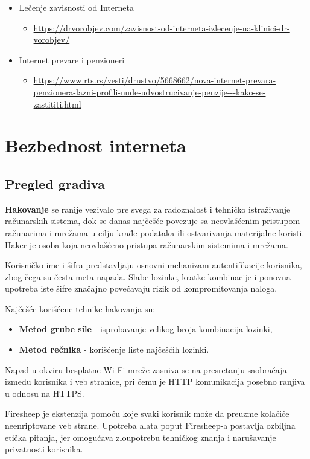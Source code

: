 \documentclass[a4paper, 12pt]{article}
\begin{document}
\begin{itemize}
    \item Lečenje zavisnosti od Interneta
    \begin{itemize}
        \item \url{https://drvorobjev.com/zavisnost-od-interneta-izlecenje-na-klinici-dr-vorobjev/}
    \end{itemize}
    \item Internet prevare i penzioneri
    \begin{itemize}
        \item \url{https://www.rts.rs/vesti/drustvo/5668662/nova-internet-prevara-penzionera-lazni-profili-nude-udvostrucivanje-penzije---kako-se-zastititi.html}
    \end{itemize}
    
\end{itemize}


\section{Bezbednost interneta}
\subsection{Pregled gradiva}
\textbf{Hakovanje} se ranije vezivalo pre svega za radoznalost i tehničko istraživanje
računarskih sistema, dok se danas najčešće povezuje sa neovlašćenim pristupom
računarima i mrežama u cilju krađe podataka ili ostvarivanja materijalne koristi.
Haker je osoba koja neovlašćeno pristupa računarskim sistemima i mrežama.

Korisničko ime i šifra predstavljaju osnovni mehanizam autentifikacije korisnika,
zbog čega su česta meta napada. Slabe lozinke, kratke kombinacije i ponovna upotreba
iste šifre značajno povećavaju rizik od kompromitovanja naloga.

Najčešće korišćene tehnike hakovanja su:
\begin{itemize}
    \item \textbf{Metod grube sile} - isprobavanje velikog broja kombinacija lozinki,
    \item \textbf{Metod rečnika} - korišćenje liste najčešćih lozinki.
\end{itemize}

Napad u okviru besplatne Wi-Fi mreže zasniva se na presretanju saobraćaja između
korisnika i veb stranice, pri čemu je HTTP komunikacija posebno ranjiva u odnosu
na HTTPS.

Firesheep je ekstenzija pomoću koje svaki korisnik može da preuzme kolačiće neenriptovane veb strane.
Upotreba alata poput Firesheep-a postavlja ozbiljna etička pitanja, jer omogućava
zloupotrebu tehničkog znanja i narušavanje privatnosti korisnika.
\end{document}

